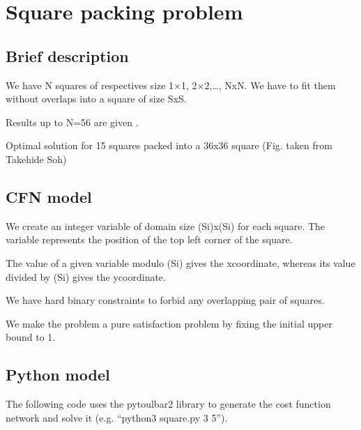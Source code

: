 \documentclass[letterpaper,10pt,openany,oneside,english]{sphinxmanual}
\let\sphinxpxdimen\pdfpxdimen\else\newdimen\sphinxpxdimen
\begin{document}
\sphinxstepscope


\section{Square packing problem}
\label{\detokenize{examples/tuto_spp:square-packing-problem}}\label{\detokenize{examples/tuto_spp:tuto-spp}}\label{\detokenize{examples/tuto_spp::doc}}



\subsection{Brief description}
\label{\detokenize{examples/tuto_spp:brief-description}}
\sphinxAtStartPar
We have N squares of respectives size 1×1, 2×2,…, NxN. We have to fit them without overlaps into a square of size SxS.

\sphinxAtStartPar
Results up to N=56 are given .

\sphinxAtStartPar
Optimal solution for 15 squares packed into a 36x36 square (Fig. taken from Takehide Soh)

\noindent\sphinxincludegraphics[height=250\sphinxpxdimen]{{square}.png}


\subsection{CFN model}
\label{\detokenize{examples/tuto_spp:cfn-model}}
\sphinxAtStartPar
We create an integer variable of domain size (S\sphinxhyphen{}i)x(S\sphinxhyphen{}i) for each square.
The variable represents the position of the top left corner of the square.

\sphinxAtStartPar
The value of a given variable modulo (S\sphinxhyphen{}i) gives the x\sphinxhyphen{}coordinate, whereas its value divided by (S\sphinxhyphen{}i) gives the y\sphinxhyphen{}coordinate.

\sphinxAtStartPar
We have hard binary constraints to forbid any overlapping pair of squares.

\sphinxAtStartPar
We make the problem a pure satisfaction problem by fixing the initial upper bound to 1.


\subsection{Python model}
\label{\detokenize{examples/tuto_spp:python-model}}
\sphinxAtStartPar
The following code uses the pytoulbar2 library to generate the cost function network and solve it (e.g. “python3 square.py 3 5”).
\end{document}
